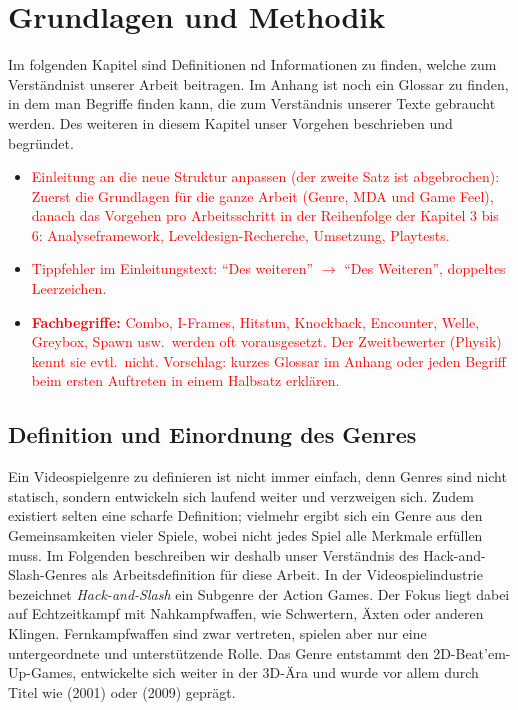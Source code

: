 \documentclass[../Main.tex]{subfiles}
\begin{document}
\section{Grundlagen und Methodik} \label{sec:Grundlagen}
Im folgenden Kapitel sind Definitionen nd Informationen zu finden, welche zum Verständnist unserer Arbeit beitragen. Im Anhang ist noch ein Glossar zu finden, in dem man Begriffe finden kann, die zum Verständnis unserer Texte gebraucht werden. Des weiteren in diesem Kapitel unser Vorgehen beschrieben und begründet.

\begin{itemize}[leftmargin=1.5cm]
    \item \textcolor{red}{Einleitung an die neue Struktur anpassen (der zweite Satz ist abgebrochen): Zuerst die Grundlagen für die ganze Arbeit (Genre, MDA und Game Feel), danach das Vorgehen pro Arbeitsschritt in der Reihenfolge der Kapitel 3 bis 6: Analyseframework, Leveldesign-Recherche, Umsetzung, Playtests.}
    \item \textcolor{red}{Tippfehler im Einleitungstext: \enquote{Des weiteren} $\rightarrow$ \enquote{Des Weiteren}, doppeltes Leerzeichen.}
    \item \textcolor{red}{\textbf{Fachbegriffe:} Combo, I-Frames, Hitstun, Knockback, Encounter, Welle, Greybox, Spawn usw.\ werden oft vorausgesetzt. Der Zweitbewerter (Physik) kennt sie evtl.\ nicht. Vorschlag: kurzes Glossar im Anhang oder jeden Begriff beim ersten Auftreten in einem Halbsatz erklären.}
\end{itemize}

\subsection{Definition und Einordnung des Genres} \label{sec:Genredefinition}
Ein Videospielgenre zu definieren ist nicht immer einfach, denn Genres sind nicht statisch, sondern entwickeln sich laufend weiter und verzweigen sich. Zudem existiert selten eine scharfe Definition; vielmehr ergibt sich ein Genre aus den Gemeinsamkeiten vieler Spiele, wobei nicht jedes Spiel alle Merkmale erfüllen muss. Im Folgenden beschreiben wir deshalb unser Verständnis des Hack-and-Slash-Genres als Arbeitsdefinition für diese Arbeit. In der Videospielindustrie bezeichnet \textit{Hack-and-Slash} ein Subgenre der Action Games.\autocite{wikipedia_hackandslash} Der Fokus liegt dabei auf Echtzeitkampf mit Nahkampfwaffen, wie Schwertern, Äxten oder anderen Klingen. Fernkampfwaffen sind zwar vertreten, spielen aber nur eine untergeordnete und unterstützende Rolle. Das Genre entstammt den 2D-Beat'em-Up-Games, entwickelte sich weiter in der 3D-Ära und wurde vor allem durch Titel wie  (2001)\autocite{wikipedia_devilmaycry} oder  (2009)\autocite{wikipedia_bayonetta} geprägt.
\end{document}

